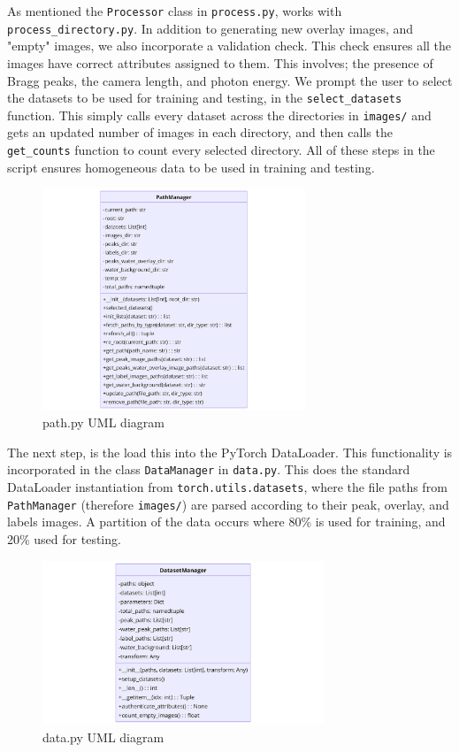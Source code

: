 \documentclass[12pt]{article}
\begin{document}
As mentioned the \texttt{Processor} class in \texttt{process.py}, works with \texttt{process\_directory.py}. In addition to generating new overlay images, and "empty" images, we also incorporate a validation check. This check ensures all the images have correct attributes assigned to them. This involves; the presence of Bragg peaks, the camera length, and photon energy. We prompt the user to select the datasets to be used for training and testing, in the \texttt{select\_datasets} function. This simply calls every dataset across the directories in \texttt{images/} and gets an updated number of images in each directory, and then calls the \texttt{get\_counts} function to count every selected directory. All of these steps in the script ensures homogeneous data to be used in training and testing.\\

\begin{figure}[H]
    \centering
    \includegraphics[width=0.7\textwidth]{uml_diagrams/path_uml.png}
    \caption{path.py UML diagram}
    \label{fig:path}
\end{figure}

The next step, is the load this into the PyTorch DataLoader. This functionality is incorporated in the class \texttt{DataManager} in \texttt{data.py}. This does the standard DataLoader instantiation from \texttt{torch.utils.datasets}, where the file paths from \texttt{PathManager} (therefore \texttt{images/}) are parsed according to their peak, overlay, and labels images. A partition of the data occurs where 80\% is used for training, and 20\% used for testing.\\

\begin{figure}[H]
    \centering
    \includegraphics[width=0.75\textwidth]{uml_diagrams/data_uml.png}
    \caption{data.py UML diagram}
    \label{fig:data}
\end{figure}
\end{document}
